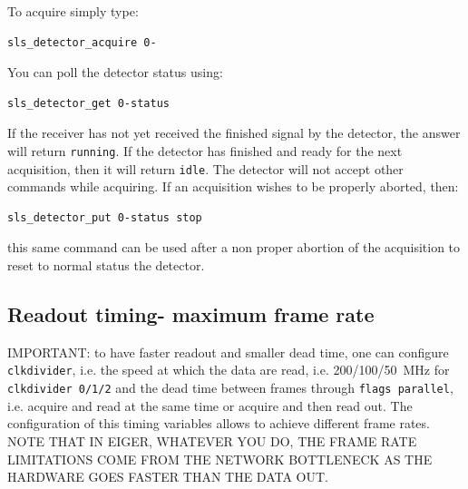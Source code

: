 \documentclass{article}
\begin{document}
To acquire simply type:
\begin{verbatim}
sls_detector_acquire 0-
\end{verbatim}

You can poll the detector status using:
\begin{verbatim}
sls_detector_get 0-status 
\end{verbatim}
If the receiver has not yet received the finished signal by the detector, the answer will return {\tt{running}}. If the detector has finished and ready for the next acquisition, then it will return {\tt{idle}}.
The detector will not accept other commands while acquiring. If an acquisition wishes to be properly aborted, then:
\begin{verbatim}
sls_detector_put 0-status stop 
\end{verbatim}
this same command can be used after a non proper abortion of the acquisition to reset to normal status the detector.

\subsection{Readout timing- maximum frame rate}\label{timing}
IMPORTANT: to have faster readout and smaller dead time, one can configure {\tt{clkdivider}}, i.e. the speed at which the data are read, i.e. 200/100/50~MHz for {\tt{clkdivider 0/1/2}} and the dead time between frames through {\tt{flags parallel}}, i.e. acquire and read at the same time or acquire and then read out.
The configuration of this timing variables allows to achieve different frame rates. NOTE THAT IN EIGER, WHATEVER YOU DO, THE FRAME RATE LIMITATIONS COME FROM THE NETWORK BOTTLENECK AS THE HARDWARE GOES FASTER THAN THE DATA OUT.
\end{document}
